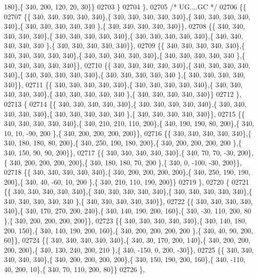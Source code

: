 \begin{DoxyCode}
      180\},\{ 340, 200, 120,  20,  30\}\}
02703 \}
02704 \},
02705 \textcolor{comment}{/* UG....GC */}
02706 \{\{
02707 \{\{ 340, 340, 340, 340, 340\},\{ 340, 340, 340, 340, 340\},\{ 340, 340, 340, 340, 340\},\{ 340, 340, 340, 340, 340
      \},\{ 340, 340, 340, 340, 340\}\},
02708 \{\{ 340, 340, 340, 340, 340\},\{ 340, 340, 340, 340, 340\},\{ 340, 340, 340, 340, 340\},\{ 340, 340, 340, 340, 340
      \},\{ 340, 340, 340, 340, 340\}\},
02709 \{\{ 340, 340, 340, 340, 340\},\{ 340, 340, 340, 340, 340\},\{ 340, 340, 340, 340, 340\},\{ 340, 340, 340, 340, 340
      \},\{ 340, 340, 340, 340, 340\}\},
02710 \{\{ 340, 340, 340, 340, 340\},\{ 340, 340, 340, 340, 340\},\{ 340, 340, 340, 340, 340\},\{ 340, 340, 340, 340, 340
      \},\{ 340, 340, 340, 340, 340\}\},
02711 \{\{ 340, 340, 340, 340, 340\},\{ 340, 340, 340, 340, 340\},\{ 340, 340, 340, 340, 340\},\{ 340, 340, 340, 340, 340
      \},\{ 340, 340, 340, 340, 340\}\}
02712 \},
02713 \{
02714 \{\{ 340, 340, 340, 340, 340\},\{ 340, 340, 340, 340, 340\},\{ 340, 340, 340, 340, 340\},\{ 340, 340, 340, 340, 340
      \},\{ 340, 340, 340, 340, 340\}\},
02715 \{\{ 340, 340, 340, 340, 340\},\{ 340, 210, 210, 110, 200\},\{ 340, 190, 190,  80, 200\},\{ 340,  10,  10, -90, 200
      \},\{ 340, 200, 200, 200, 200\}\},
02716 \{\{ 340, 340, 340, 340, 340\},\{ 340, 180, 180,  80, 200\},\{ 340, 250, 190, 180, 200\},\{ 340, 200, 200, 200, 200
      \},\{ 340, 150,  90,  90, 200\}\},
02717 \{\{ 340, 340, 340, 340, 340\},\{ 340,  70,  70, -30, 200\},\{ 340, 200, 200, 200, 200\},\{ 340, 180, 180,  70, 200
      \},\{ 340,   0, -100, -30, 200\}\},
02718 \{\{ 340, 340, 340, 340, 340\},\{ 340, 200, 200, 200, 200\},\{ 340, 250, 190, 190, 200\},\{ 340,  40, -60,  10, 200
      \},\{ 340, 210, 110, 190, 200\}\}
02719 \},
02720 \{
02721 \{\{ 340, 340, 340, 340, 340\},\{ 340, 340, 340, 340, 340\},\{ 340, 340, 340, 340, 340\},\{ 340, 340, 340, 340, 340
      \},\{ 340, 340, 340, 340, 340\}\},
02722 \{\{ 340, 340, 340, 340, 340\},\{ 340, 170, 270, 200, 240\},\{ 340, 140, 190, 200, 160\},\{ 340, -30, 110, 200,  80
      \},\{ 340, 200, 200, 200, 200\}\},
02723 \{\{ 340, 340, 340, 340, 340\},\{ 340, 140, 180, 200, 150\},\{ 340, 140, 190, 200, 160\},\{ 340, 200, 200, 200, 200
      \},\{ 340,  40,  90, 200,  60\}\},
02724 \{\{ 340, 340, 340, 340, 340\},\{ 340,  30, 170, 200, 140\},\{ 340, 200, 200, 200, 200\},\{ 340, 130, 240, 200, 210
      \},\{ 340, -150,   0, 200, -30\}\},
02725 \{\{ 340, 340, 340, 340, 340\},\{ 340, 200, 200, 200, 200\},\{ 340, 150, 190, 200, 160\},\{ 340, -110,  40, 200,  
      10\},\{ 340,  70, 110, 200,  80\}\}
02726 \},

\end{DoxyCode}
